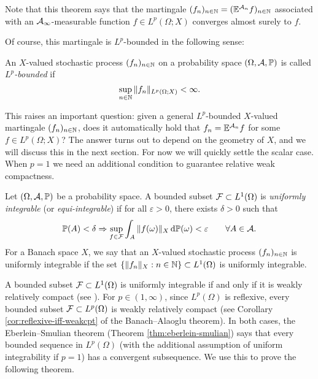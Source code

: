 Note that this theorem says that the martingale $(f_n)_{n \in \mathbb{N}} = (\mathbb{E}^{\mathcal{A}_n} f)_{n \in \mathbb{N}}$ associated with an $\mathcal{A}_{\infty}$-measurable function $f \in L^p(\Omega;X)$ converges almost surely to $f$.

Of course, this martingale is $L^p$-bounded in the following sense:

\begin{defn}
  An $X$-valued stochastic process $(f_n)_{n \in \mathbb{N}}$ on a probability space $(\Omega,\mathcal{A},\mathbb{P})$ is called \emph{$L^p$-bounded} if
  \begin{equation*}
    \sup_{n \in \mathbb{N}} \|f_n\|_{L^p(\Omega;X)} < \infty.
  \end{equation*}
\end{defn}

This raises an important question: given a general $L^p$-bounded $X$-valued martingale $(f_n)_{n \in \mathbb{N}}$, does it automatically hold that $f_n = \mathbb{E}^{\mathcal{A}_n} f$ for some $f \in L^p(\Omega;X)$?
The answer turns out to depend on the geometry of $X$, and we will discuss this in the next section.
For now we will quickly settle the scalar case.
When $p=1$ we need an additional condition to guarantee relative weak compactness.

\begin{defn}\label{defn:UI}
  Let $(\Omega,\mathcal{A},\mathbb{P})$ be a probability space.
  A bounded subset $\mathcal{F} \subset L^1(\Omega)$ is \emph{uniformly integrable} (or \emph{equi-integrable}) if for all $\varepsilon > 0$, there exists $\delta > 0$ such that
  \begin{equation*}
    \mathbb{P}(A) < \delta \Rightarrow \sup_{f \in \mathcal{F}} \int_{A} \|f(\omega)\|_X \, \mathrm{d}\mathbb{P}(\omega) < \varepsilon \qquad \forall A \in \mathcal{A}.
  \end{equation*}
  For a Banach space $X$, we say that an $X$-valued stochastic process $(f_n)_{n \in \mathbb{N}}$ is uniformly integrable if the set $\{\|f_n\|_{X} : n \in \mathbb{N}\} \subset L^1(\Omega)$ is uniformly integrable. 
\end{defn}

A bounded subset $\mathcal{F} \subset L^1(\Omega)$ is uniformly integrable if and only if it is weakly relatively compact (see \cite[Theorem 5.2.9]{AK06}).
For $p \in (1,\infty)$, since $L^p(\Omega)$ is reflexive, every bounded subset $\mathcal{F} \subset L^p(\Omega)$ is weakly relatively compact (see Corollary \ref{cor:reflexive-iff-weakcpt} of the Banach--Alaoglu theorem).
In both cases, the Eberlein--Smulian theorem (Theorem \ref{thm:eberlein-smulian}) says that every bounded sequence in $L^p(\Omega)$ (with the additional assumption of uniform integrability if $p=1$) has a convergent subsequence.
We use this to prove the following theorem.

